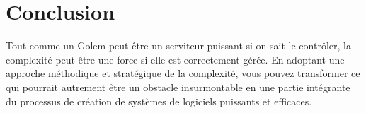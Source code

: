 \section{Conclusion}

Tout comme un Golem peut être un serviteur puissant si on sait le contrôler, la complexité peut être une force si elle est correctement gérée. En adoptant une approche méthodique et stratégique de la complexité, vous pouvez transformer ce qui pourrait autrement être un obstacle insurmontable en une partie intégrante du processus de création de systèmes de logiciels puissants et efficaces.

